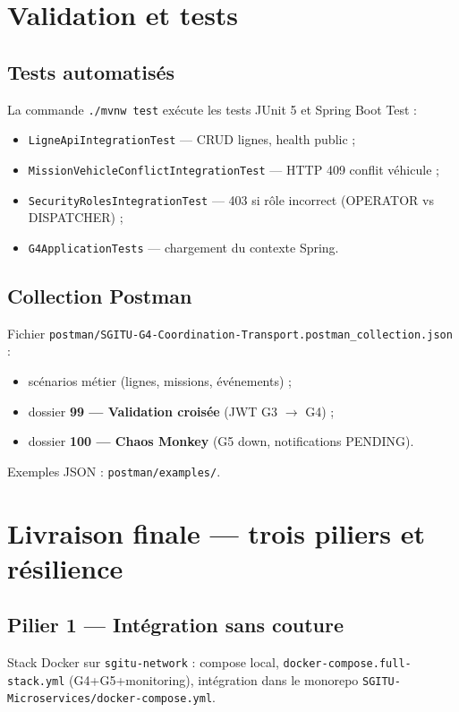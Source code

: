 \documentclass[12pt,a4paper]{report}
\begin{document}
\chapter{Validation et tests}

\section{Tests automatisés}
La commande \texttt{./mvnw test} exécute les tests JUnit 5 et Spring Boot Test :
\begin{itemize}
    \item \texttt{LigneApiIntegrationTest} — CRUD lignes, health public ;
    \item \texttt{MissionVehicleConflictIntegrationTest} — HTTP 409 conflit véhicule ;
    \item \texttt{SecurityRolesIntegrationTest} — 403 si rôle incorrect (OPERATOR vs DISPATCHER) ;
    \item \texttt{G4ApplicationTests} — chargement du contexte Spring.
\end{itemize}

\section{Collection Postman}
Fichier \texttt{postman/SGITU-G4-Coordination-Transport.postman\_collection.json} :
\begin{itemize}
    \item scénarios métier (lignes, missions, événements) ;
    \item dossier \textbf{99 — Validation croisée} (JWT G3 $\rightarrow$ G4) ;
    \item dossier \textbf{100 — Chaos Monkey} (G5 down, notifications PENDING).
\end{itemize}

Exemples JSON : \texttt{postman/examples/}.

\chapter{Livraison finale — trois piliers et résilience}

\section{Pilier 1 — Intégration sans couture}
Stack Docker sur \texttt{sgitu-network} : compose local, \texttt{docker-compose.full-stack.yml} (G4+G5+monitoring), intégration dans le monorepo \texttt{SGITU-Microservices/docker-compose.yml}.
\end{document}
